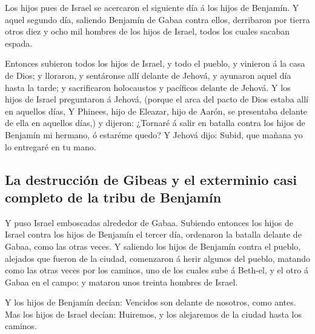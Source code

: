  Los hijos pues de Israel se acercaron el siguiente día á
los hijos de Benjamín.  Y aquel segundo día, saliendo
Benjamín de Gabaa contra ellos, derribaron por tierra otros diez y ocho
mil hombres de los hijos de Israel, todos los cuales sacaban espada.

 Entonces subieron todos los hijos de Israel, y todo el
pueblo, y vinieron á la casa de Dios; y lloraron, y sentáronse allí
delante de Jehová, y ayunaron aquel día hasta la tarde; y sacrificaron
holocaustos y pacíficos delante de Jehová.  Y los hijos de
Israel preguntaron á Jehová, (porque el arca del pacto de Dios estaba
allí en aquellos días,  Y Phinees, hijo de Eleazar, hijo de
Aarón, se presentaba delante de ella en aquellos días,) y dijeron:
¿Tornaré á salir en batalla contra los hijos de Benjamín mi hermano, ó
estaréme quedo? Y Jehová dijo: Subid, que mañana yo lo entregaré en tu
mano.

\hypertarget{la-destrucciuxf3n-de-gibeas-y-el-exterminio-casi-completo-de-la-tribu-de-benjamuxedn}{%
\subsection{La destrucción de Gibeas y el exterminio casi completo de la
tribu de
Benjamín}\label{la-destrucciuxf3n-de-gibeas-y-el-exterminio-casi-completo-de-la-tribu-de-benjamuxedn}}

 Y puso Israel emboscadas alrededor de Gabaa. 
Subiendo entonces los hijos de Israel contra los hijos de Benjamín el
tercer día, ordenaron la batalla delante de Gabaa, como las otras veces.
 Y saliendo los hijos de Benjamín contra el pueblo,
alejados que fueron de la ciudad, comenzaron á herir algunos del pueblo,
matando como las otras veces por los caminos, uno de los cuales sube á
Beth-el, y el otro á Gabaa en el campo: y mataron unos treinta hombres
de Israel.

 Y los hijos de Benjamín decían: Vencidos son delante de
nosotros, como antes. Mas los hijos de Israel decían: Huiremos, y los
alejaremos de la ciudad hasta los caminos.


